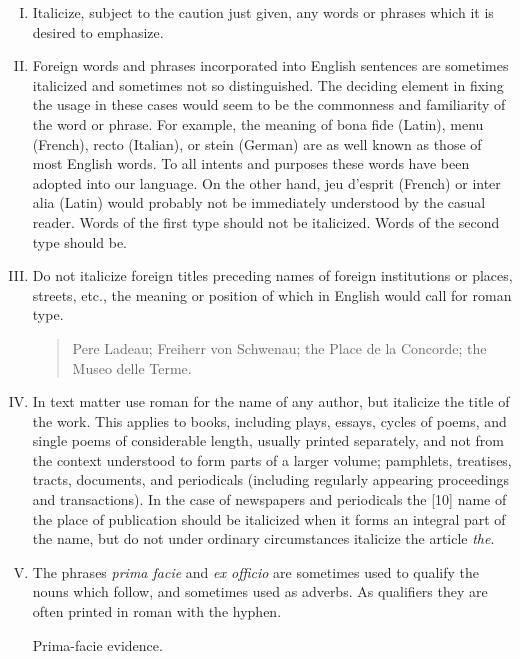 \begin{enumerate}[I.]
\item  Italicize, subject to the caution just given, any words or phrases which it is desired to emphasize.

\item Foreign words and phrases incorporated into English sentences are sometimes italicized and sometimes not so distinguished. The deciding element in fixing the usage in these cases would seem to be the commonness and familiarity of the word or phrase. For example, the meaning of bona fide (Latin), menu (French), recto (Italian), or stein (German) are as well known as those of most English words. To all intents and purposes these words have been adopted into our language. On the other hand, jeu d'esprit (French) or inter alia (Latin) would probably not be immediately understood by the casual reader. Words of the first type should not be italicized. Words of the second type should be.

\item Do not italicize foreign titles preceding names of foreign institutions or places, streets, etc., the meaning or position of which in English would call for roman type.
        \begin{quote}
         \noindent Pere Ladeau; Freiherr von Schwenau; the Place de la Concorde; the Museo delle Terme.
       \end{quote}

\item In text matter use roman for the name of any author, but italicize the title of the work. This applies to books, including plays, essays, cycles of poems, and single poems of considerable length, usually printed separately, and not from the context understood to form parts of a larger volume; pamphlets, treatises, tracts, documents, and periodicals (including regularly appearing proceedings and transactions). In the case of newspapers and periodicals the [10] name of the place of publication should be italicized when it forms an integral part of the name, but do not under ordinary circumstances italicize the article \emph{the}.


\item The phrases \textit{prima facie} and \textit{ex officio} are sometimes used to qualify the nouns which follow, and sometimes used as adverbs. As qualifiers they are often printed in roman with the hyphen.

     \hspace*{1em} Prima-facie evidence.


\end{enumerate}

